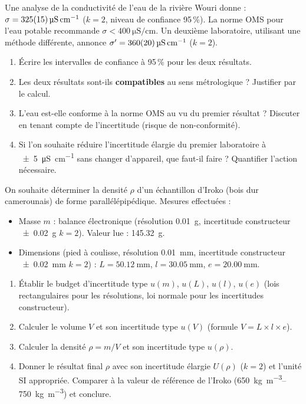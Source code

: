 \documentclass[11pt]{article}
\begin{document}
\begin{exercice}
Une analyse de la conductivité de l'eau de la rivière Wouri donne : $\sigma = \SI{325 \pm 15}{\micro\siemens\per\centi\meter}$ ($k=2$, niveau de confiance 95\,\%). La norme OMS pour l'eau potable recommande $\sigma < \SI{400}{\micro\siemens\per\centi\meter}$. Un deuxième laboratoire, utilisant une méthode différente, annonce $\sigma' = \SI{360 \pm 20}{\micro\siemens\per\centi\meter}$ ($k=2$).
\begin{enumerate}
    \item Écrire les intervalles de confiance à 95\,\% pour les deux résultats.
    \item Les deux résultats sont-ils \textbf{compatibles} au sens métrologique ? Justifier par le calcul.
    \item L'eau est-elle conforme à la norme OMS au vu du premier résultat ? Discuter en tenant compte de l'incertitude (risque de non-conformité).
    \item Si l'on souhaite réduire l'incertitude élargie du premier laboratoire à \SI{\pm 5}{\micro\siemens\per\centi\meter} sans changer d'appareil, que faut-il faire ? Quantifier l'action nécessaire.
\end{enumerate}
\end{exercice}

\begin{exercice}
On souhaite déterminer la densité $\rho$ d'un échantillon d'Iroko (bois dur camerounais) de forme parallélépipédique. Mesures effectuées :
\begin{itemize}
    \item Masse $m$ : balance électronique (résolution \SI{0.01}{\gram}, incertitude constructeur \SI{\pm 0.02}{\gram} $k=2$). Valeur lue : \SI{145.32}{\gram}.
    \item Dimensions (pied à coulisse, résolution \SI{0.01}{\milli\meter}, incertitude constructeur \SI{\pm 0.02}{\milli\meter} $k=2$) :
    $L = \SI{50.12}{\milli\meter}$, $l = \SI{30.05}{\milli\meter}$, $e = \SI{20.00}{\milli\meter}$.
\end{itemize}
\begin{enumerate}
    \item Établir le budget d'incertitude type $u(m)$, $u(L)$, $u(l)$, $u(e)$ (lois rectangulaires pour les résolutions, loi normale pour les incertitudes constructeur).
    \item Calculer le volume $V$ et son incertitude type $u(V)$ (formule $V = L \times l \times e$).
    \item Calculer la densité $\rho = m/V$ et son incertitude type $u(\rho)$.
    \item Donner le résultat final $\rho$ avec son incertitude élargie $U(\rho)$ ($k=2$) et l'unité SI appropriée. Comparer à la valeur de référence de l'Iroko (\SIrange{650}{750}{\kilo\gram\per\meter\cubed}) et conclure.
\end{enumerate}
\end{exercice}
\end{document}

